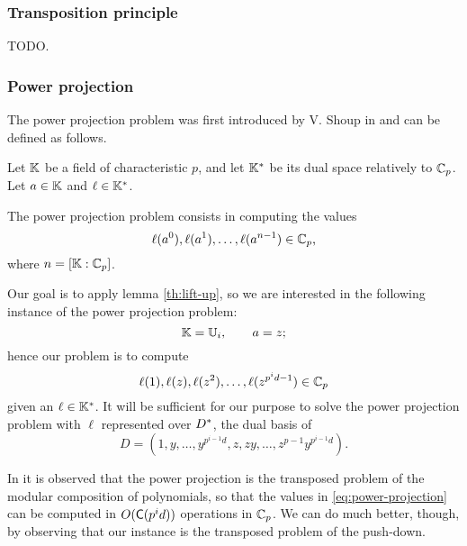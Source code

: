 \subsubsection{Transposition principle}
TODO.

\begin{theorem}
  \label{th:transposition}
  
\end{theorem}


\subsubsection{Power projection}
\label{sec:level-embedding:power-projection}
The power projection problem was first introduced by V. Shoup in
\cite{Sho94} and can be defined as follows.

\begin{definition}
  Let $\mathbb{K}$ be a field of characteristic $p$, and let $\mathbb{K}^\ast$ be
  its dual space relatively to $\mathbb{C}_p$. Let $a\in\mathbb{K}$ and
  $\ell\in\mathbb{K}^\ast$.
  
  The power projection problem consists in computing the values
  \[\ell(a^0), \ell(a^1), \ldots, \ell(a^{n-1}) \in\mathbb{C}_p \text{,}\]
  where $n=[\mathbb{K}:\mathbb{C}_p]$.
\end{definition}

Our goal is to apply lemma \ref{th:lift-up}, so we are interested in
the following instance of the power projection problem:
\begin{equation*}
  \mathbb{K} = \mathbb{U}_i,\qquad a=z
  \text{;}
\end{equation*}
hence our problem is to compute 
\begin{equation}
  \label{eq:power-projection}
  \ell(1), \ell(z), \ell(z^2), \ldots, \ell(z^{p^id-1}) \in\mathbb{C}_p
\end{equation}
given an $\ell\in \mathbb{K}^\ast$. It will be sufficient for our purpose to
solve the power projection problem with $\ell$ represented over
$D^\ast$, the dual basis of
\begin{equation}
  D = (1,y,\ldots,y^{p^{i-1}d},z,zy,\ldots,z^{p-1}y^{p^{i-1}d}) \text{.}
\end{equation}

In \cite{Sho94} it is observed that the power projection is the
transposed problem of the modular composition of polynomials, so that
the values in \eqref{eq:power-projection} can be computed in
$O(\mathrm{\sf C}(p^id))$ operations in $\mathbb{C}_p$. We can do much better,
though, by observing that our instance is the transposed problem of
the push-down.

